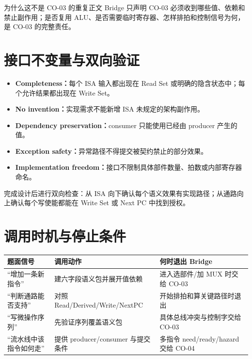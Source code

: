 \documentclass[UTF8,fontset=fandol,11pt,a4paper]{ctexart}
\newcommand{\kw}[1]{\textbf{\color{deep}#1}}
\begin{document}
\begin{examplebox}{为什么这不是 CO-03 的重复正文}
Bridge 只声明 CO-03 必须收到哪些值、依赖和禁止副作用；是否复用 ALU、是否需要临时寄存器、怎样排拍和控制信号为何，是 CO-03 的完整责任。
\end{examplebox}

\section{接口不变量与双向验证}

\begin{itemize}
  \item \kw{Completeness：}每个 ISA 输入都出现在 Read Set 或明确的隐含状态中；每个允许结果都出现在 Write Set。
  \item \kw{No invention：}实现需求不能新增 ISA 未规定的架构副作用。
  \item \kw{Dependency preservation：}consumer 只能使用已经由 producer 产生的值。
  \item \kw{Exception safety：}异常路径不得提交被契约禁止的部分效果。
  \item \kw{Implementation freedom：}接口不限制具体部件数量、拍数或内部寄存器命名。
\end{itemize}

完成设计后进行双向检查：从 ISA 向下确认每个语义效果有实现路径；从通路向上确认每个写使能都能在 Write Set 或 Next PC 中找到授权。

\section{调用时机与停止条件}

\begin{center}
\small
\begin{tabularx}{\linewidth}{L{3.2cm}Y Y}
\toprule
题面信号 & 调用动作 & 何时退出 Bridge\\
\midrule
“增加一条新指令” & 建六字段语义包并展开值依赖 & 进入选部件/加 MUX 时交给 CO-03\\
“判断通路能否支持” & 对照 Read/Derived/Write/NextPC & 开始排拍和算关键路径时退出\\
“写微操作序列” & 先验证序列覆盖语义包 & 具体总线冲突与控制字交给 CO-03\\
“流水线中该指令如何走” & 提供 producer/consumer 与提交条件 & 多指令 need/ready/hazard 交给 CO-04\\
\bottomrule
\end{tabularx}
\end{center}
\end{document}
